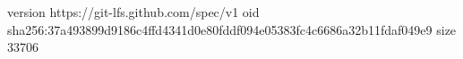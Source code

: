 version https://git-lfs.github.com/spec/v1
oid sha256:37a493899d9186c4ffd4341d0e80fddf094e05383fc4c6686a32b11fdaf049e9
size 33706
